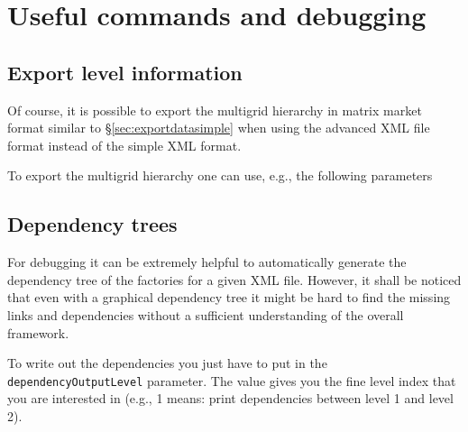 \documentclass[10pt,fleqn]{book}
\begin{document}
\chapter{Useful commands and debugging}

\section{Export level information}
Of course, it is possible to export the multigrid hierarchy in matrix market format similar to \S\ref{sec:exportdatasimple} when using the advanced XML file format instead of the simple XML format.

To export the multigrid hierarchy one can use, e.g., the following parameters



\section{Dependency trees}
\label{sec:dependencytrees}
For debugging it can be extremely helpful to automatically generate the dependency tree of the factories for a given XML file. However, it shall be noticed that even with a graphical dependency tree it might be hard to find the missing links and dependencies without a sufficient understanding of the overall framework.

To write out the dependencies you just have to put in the \verb|dependencyOutputLevel| parameter. The value gives you the fine level index that you are interested in (e.g., 1 means: print dependencies between level 1 and level 2).


\end{document}
